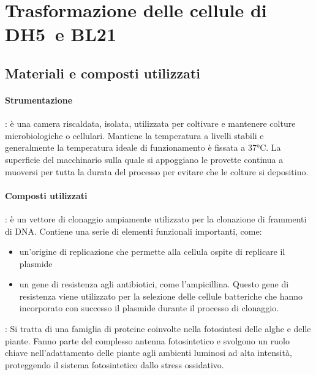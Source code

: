 \section{Trasformazione delle cellule di  DH5\textalpha\ e BL21}\label{sec:6}

\subsection{Materiali e composti utilizzati}
\paragraph{Strumentazione}
\begin{itemize}
	\itemb[Incubatore]: è una camera riscaldata, isolata, utilizzata per coltivare e mantenere colture microbiologiche o cellulari.	Mantiene la temperatura a livelli stabili e generalmente la temperatura ideale di funzionamento è fissata a 37°C. La superficie del macchinario sulla quale si appoggiano le provette continua a muoversi per tutta la durata del processo per evitare che le colture si depositino.
\end{itemize}
\paragraph{Composti utilizzati}
\begin{itemize}
	: è un vettore di clonaggio ampiamente utilizzato per la clonazione di frammenti di DNA. Contiene una serie di elementi funzionali importanti, come:
	\begin{itemize}[person]
		\item un'origine di replicazione che permette alla cellula ospite di replicare il plasmide
		\item un gene di resistenza agli antibiotici, come l'ampicillina. Questo gene di resistenza viene utilizzato per la selezione delle cellule batteriche che hanno incorporato con successo il plasmide durante il processo di clonaggio.
	\end{itemize}
	: Si tratta di una famiglia di proteine coinvolte nella fotosintesi delle alghe e delle piante. Fanno parte del complesso antenna fotosintetico e svolgono un ruolo chiave nell'adattamento delle piante agli ambienti luminosi ad alta intensità, proteggendo il sistema fotosintetico dallo stress ossidativo.
\end{itemize}


